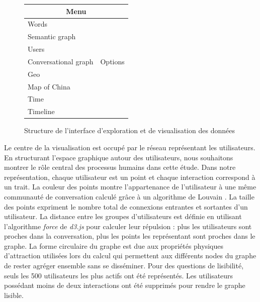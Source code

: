     \begin{figure}[htbp]
        \label{fig:schema-viz}
        \centering

        \begin{tabular}{ | p{5cm} | p{2cm} | }
            \hline
            \multicolumn{2}{|c|}{Menu} \\[.3cm] 
            \hline
            Words  &         \\
            Semantic graph &  \\[.5cm] \cline{1-1}
            Users &  \\
            Conversational graph & Options\\[.5cm] \cline{1-1}
            Geo &  \\
            Map of China &  \\[.5cm] \cline{1-1}
            Time   & \\
            Timeline &  \\[.5cm]
            \hline 
        \end{tabular}
        \caption{Structure de l'interface d'exploration et de visualisation des données}
    \end{figure}


    Le centre de la visualisation est occupé par le réseau représentant les utilisateurs. En structurant l'espace graphique autour des  utilisateurs, nous souhaitons montrer le r\^ole central des processus humains dans cette étude. Dans notre représentation, chaque utilisateur est un point et chaque interaction correspond à un trait. La couleur des points montre l{\textquoteright}appartenance de l{\textquoteright}utilisateur à une m\^eme communauté de conversation calculé gr\^ace à un algorithme de Louvain \citep{Blondel2008}. La taille des points expriment le nombre total de connexions entrantes et sortantes d{\textquoteright}un utilisateur. La distance entre les groupes d{\textquoteright}utilisateurs est définie en utilisant l{\textquoteright}algorithme \textit{force} de \textit{d3.js} \citep{Bostock2011} pour calculer leur répulsion : plus les utilisateurs sont proches dans la conversation, plus les points les représentant sont proches dans le graphe. La forme circulaire du graphe est due aux propriétés physiques d{\textquoteright}attraction utilisées lors du calcul qui permettent aux différents nodes du graphe de rester agréger ensemble sans se disséminer. Pour des questions de lisibilité, seuls les 500 utilisateurs les plus actifs ont été représentés. Les utilisateurs possédant moins de deux interactions ont été supprimés pour rendre le graphe lisible. 
    
